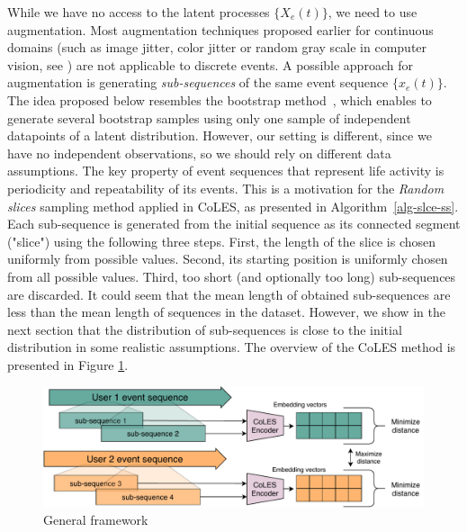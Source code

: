 \documentclass{article}
\begin{document}
While we have no access to the latent processes $\{X_e(t)\}$, we need to use augmentation. Most augmentation techniques proposed earlier for continuous domains (such as image jitter, color jitter or random gray scale in computer vision, see \cite{Falcon2020AFF}) are not applicable to discrete events. A possible approach for augmentation is generating
{\it sub-sequences} of the same event sequence $\{x_e(t)\}$. The idea proposed below resembles the bootstrap method~\citep{Efron1994Bootstrap}, which enables to generate several bootstrap samples using only one sample of independent datapoints of a latent distribution. However, our setting is different, since we have no independent observations, so we should rely on different data assumptions. 
The key property of event sequences that represent life activity is periodicity and repeatability of its events. This is a motivation for the \textit{Random slices} sampling method applied in CoLES, as presented in Algorithm~\ref{alg-slce-ss}. Each sub-sequence is generated from the initial sequence as its connected segment ("slice") using the following three steps. First, the length of the slice is chosen uniformly from possible values. Second, its starting position is uniformly chosen from all possible values. Third, too short (and optionally too long) sub-sequences are discarded. It could seem that the mean length of obtained sub-sequences are less than the mean length of sequences in the dataset. However, we show in the next section that the distribution of sub-sequences is close to the initial distribution in some realistic assumptions. The overview of the CoLES method is presented in Figure \ref{fig-arch}.


\begin{figure}[htbp]
  \includegraphics[width=\linewidth]{figures/CoLES-arch.pdf}
\caption{General framework}
  \label{fig-arch}
\end{figure}
\end{document}
